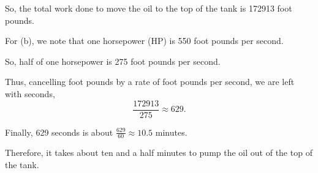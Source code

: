 \documentclass[../hw7.tex]{subfiles}
\begin{document}
So, the total work done to move the oil to the top of the tank is 172913 foot pounds.

For (b), we note that one horsepower (HP) is 550 foot pounds per second.

So, half of one horsepower is 275 foot pounds per second.

Thus, cancelling foot pounds by a rate of foot pounds per second, we are left with seconds, \[\frac{172913}{275} \approx 629.\]

Finally, 629 seconds is about $\frac{629}{60} \approx 10.5$ minutes.

Therefore, it takes about ten and a half minutes to pump the oil out of the top of the tank.
\end{document}
